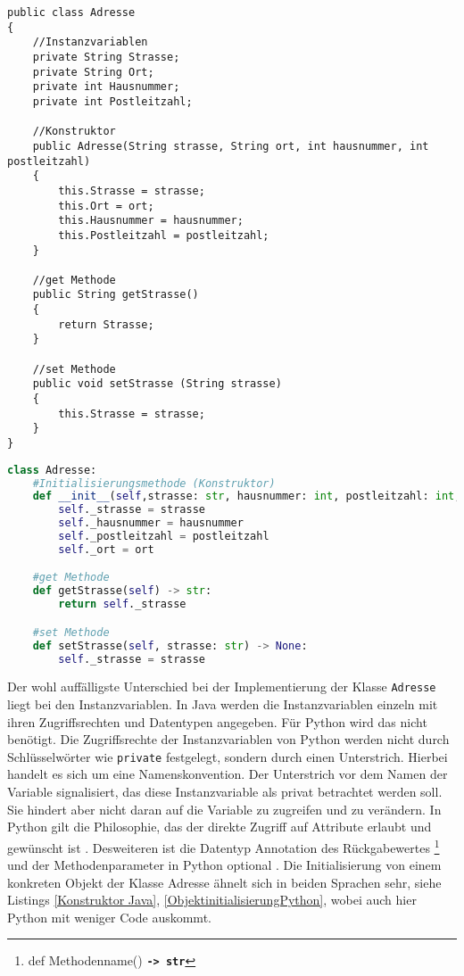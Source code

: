 \begin{lstlisting}[caption=Die Klasse Adresse in Java, label=Adressejava]
public class Adresse
{
    //Instanzvariablen
    private String Strasse;
    private String Ort;
    private int Hausnummer;
    private int Postleitzahl;

    //Konstruktor
    public Adresse(String strasse, String ort, int hausnummer, int postleitzahl)
    {
        this.Strasse = strasse;
        this.Ort = ort;
        this.Hausnummer = hausnummer;
        this.Postleitzahl = postleitzahl;
    }

    //get Methode
    public String getStrasse() 
    {
        return Strasse;
    }

    //set Methode
    public void setStrasse (String strasse)
    {
        this.Strasse = strasse;
    }
}
\end{lstlisting}

\begin{lstlisting}[caption=Die Klasse Adresse in Python, label=AdressePython,language=Python]
class Adresse:
    #Initialisierungsmethode (Konstruktor)
    def __init__(self,strasse: str, hausnummer: int, postleitzahl: int, ort: str) -> None:
        self._strasse = strasse
        self._hausnummer = hausnummer
        self._postleitzahl = postleitzahl
        self._ort = ort   

    #get Methode
    def getStrasse(self) -> str:
        return self._strasse

    #set Methode
    def setStrasse(self, strasse: str) -> None:
        self._strasse = strasse

\end{lstlisting}

Der wohl auffälligste Unterschied bei der Implementierung der Klasse \texttt{Adresse} liegt bei den Instanzvariablen. In Java werden die Instanzvariablen einzeln mit ihren Zugriffsrechten und Datentypen angegeben. Für Python wird das nicht benötigt. Die Zugriffsrechte der Instanzvariablen von Python werden nicht durch Schlüsselwörter wie \texttt{private} festgelegt, sondern durch einen Unterstrich. Hierbei handelt es sich um eine Namenskonvention. Der Unterstrich vor dem Namen der Variable signalisiert, das diese Instanzvariable als privat betrachtet werden soll. Sie hindert aber nicht daran auf die Variable zu zugreifen und zu verändern. In Python gilt die Philosophie, das der direkte Zugriff auf Attribute erlaubt und gewünscht ist \cite{PythonKalista}. Desweiteren ist die Datentyp Annotation des Rückgabewertes \footnote{def Methodenname() \textbf{\texttt{-> str}}} und der Methodenparameter in Python optional \cite{PythonBarry}. Die Initialisierung von einem konkreten Objekt der Klasse Adresse ähnelt sich in beiden Sprachen sehr, siehe Listings \ref{Konstruktor Java}, \ref{ObjektinitialisierungPython}, wobei auch hier Python mit weniger Code auskommt. 

